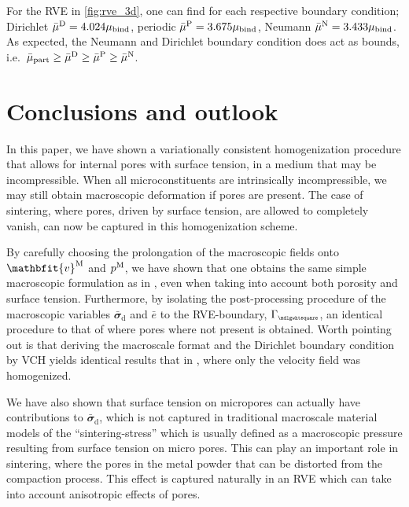 \documentclass[12pt,a4paper]{article}
\renewcommand{\ta}[1]{\mathbfit{#1}}
\renewcommand{\ts}[1]{\mathbfit{#1}}
\renewcommand{\Box}{\mdlgwhtsquare}
\renewcommand{\dev}{\mathrm{d}}
\newcommand{\Periodic}{\mathrm{P}}
\newcommand{\particle}{\mathrm{part}}
\newcommand{\rve}{
  {\mathchoice
   {\mbox{\scalebox{0.67}{$\Box$}}}
   {\mbox{\scalebox{0.67}{$\Box$}}}
   {\mbox{\scalebox{0.5}{$\Box$}}}
   {\mbox{\scalebox{0.375}{$\Box$}}}
  }
}
\begin{document}
For the RVE in \cref{fig:rve_3d}, one can find for each respective boundary condition; Dirichlet $\bar{\mu}^{\mathrm{D}} = 4.024 \mu_{\mathrm{bind}}$, periodic $\bar{\mu}^\Periodic = 3.675\mu_\binder$, Neumann $\bar{\mu}^{\mathrm{N}} = 3.433\mu_{\mathrm{bind}}$.
As expected, the Neumann and Dirichlet boundary condition does act as bounds, i.e.\ $\bar{\mu}_\particle \geq \bar{\mu}^\Dirichlet \geq \bar{\mu}^\Periodic \geq \bar{\mu}^\Neumann$.




\section{Conclusions and outlook}

In this paper, we have shown a variationally consistent homogenization procedure that allows for internal pores with surface tension, in a medium that may be incompressible.
When all microconstituents are intrinsically incompressible, we may still obtain macroscopic deformation if pores are present.
The case of sintering, where pores, driven by surface tension, are allowed to completely vanish, can now be captured in this homogenization scheme. 

By carefully choosing the prolongation of the macroscopic fields onto $\ta v^\macro$ and $p^{\mathrm{M}}$, we have shown that one obtains the same simple macroscopic formulation as in \cite{ohman_variationally_2014}, even when taking into account both porosity and surface tension.
Furthermore, by isolating the post-processing procedure of the macroscopic variables $\bar{\ts\sigma}_\dev$ and $\bar{e}$ to the RVE-boundary, $\Gamma_\rve$, an identical procedure to that of \cite{ohman_variationally_2014} where pores where not present is obtained.
Worth pointing out is that deriving the macroscale format and the Dirichlet boundary condition by VCH yields identical results that in \cite{ohman_computational_2013}, where only the velocity field was homogenized.


We have also shown that surface tension on micropores can actually have contributions to $\bar{\ts\sigma}_\dev$, which is not captured in traditional macroscale material models of the ``sintering-stress'' which is usually defined as a macroscopic pressure resulting from surface tension on micro pores.
This can play an important role in sintering, where the pores in the metal powder that can be distorted from the compaction process.
This effect is captured naturally in an RVE which can take into account anisotropic effects of pores.
\end{document}
